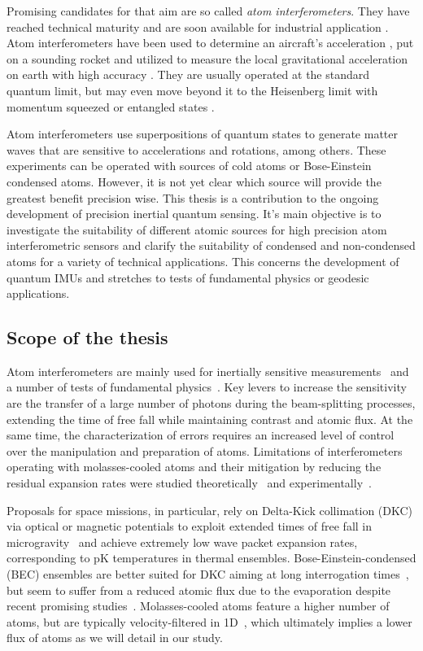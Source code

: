 Promising candidates for that aim are so called \emph{atom interferometers}. They have reached technical maturity and are soon available for industrial application \cite{Nyman2006,Geiger2011}. Atom interferometers have been used to determine an aircraft's acceleration \cite{Barrett2016}, put on a sounding rocket \cite{Seidel2015} and utilized to measure the local gravitational acceleration on earth with high accuracy \cite{Wu2019}. They are usually operated  at the standard quantum limit, but may even move beyond it to the Heisenberg limit with momentum squeezed or entangled states \cite{Szigeti2020}.

Atom interferometers use superpositions of quantum states to generate matter waves that are sensitive to accelerations and rotations, among others. These experiments can be operated with sources of cold atoms or Bose-Einstein condensed atoms. However, it is not yet clear which source will provide the greatest benefit precision wise.
This thesis is a contribution to the ongoing development of precision inertial quantum sensing. It's main objective is to investigate the suitability of different atomic sources for high precision atom interferometric sensors and clarify the suitability of condensed and non-condensed atoms for a variety of technical applications. This concerns the development of quantum IMUs and stretches to tests of fundamental physics or geodesic applications.


\subsection{Scope of the thesis}
Atom interferometers are mainly used for inertially sensitive measurements~\cite{Geiger2020arxiv} and a number of tests of fun\-da\-men\-tal physics~\cite{Bouchendira2011,Asenbaum2020arxiv}.
Key levers to increase the sensitivity are the transfer of a large number of photons during the beam-splitting processes, extending the time of free fall while maintaining contrast and atomic flux.
At the same time, the characterization of errors requires an increased level of control over the manipulation and preparation of atoms.
Limitations of interferometers operating with molasses-cooled atoms and their mitigation by reducing the residual expansion rates were studied theoretically~\cite{Loriani2019} and experimentally~\cite{LouchetChauvet2011,Schkolnik2015}.

Proposals for space missions, in particular, rely on Delta-Kick collimation (DKC) via optical or magnetic potentials to exploit extended times of free fall in microgravity~\cite{Chu1986,Ammann1997,Mntinga2013,Kovachy2015} and achieve extremely low wave packet expansion rates, corresponding to pK temperatures in thermal ensembles.
Bose-Einstein-condensed (BEC) ensembles are better suited for DKC aiming at long interrogation times~\cite{Loriani2019}, but seem to suffer from a reduced atomic flux due to the evaporation despite recent promising studies~\cite{Rudolph2015}.
Molasses-cooled atoms feature a higher number of atoms, but are typically velocity-filtered in 1D~\cite{Kasevich1991}, which ultimately implies a lower flux of atoms as we will detail in our study.

